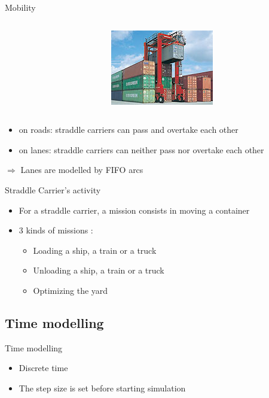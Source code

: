 \documentclass{beamer}
\begin{document}
\begin{frame}{Mobility}
\begin{center}
\begin{columns}
\begin{column}[c]{4.0cm}
    \end{column}
    \begin{column}[r]{3.0cm}	
      \includegraphics[height=.25\textheight]{fig/tn-straddle-carriers.jpg}
   \end{column}
\end{columns}
  \end{center}
\begin{itemize}
   \pause \item on roads: straddle carriers can pass and overtake each other
   \pause \item on lanes: straddle carriers can neither pass nor overtake each other
 \end{itemize}
\begin{center}
\pause $\Rightarrow$ Lanes are modelled by FIFO arcs
 \end{center}
 \end{frame}
\begin{frame}{Straddle Carrier's activity}
  \begin{itemize}   
   \item For a straddle carrier, a mission consists in moving a container
   \pause
    \item 3 kinds of missions : 
    \begin{itemize}
      \item Loading a ship, a train or a truck
      \pause
      \item Unloading a ship, a train or a truck
      \pause
      \item Optimizing the yard
    \end{itemize}
\end{itemize}
\end{frame}

  \subsection*{Time modelling}
\begin{frame}{Time modelling}  
  \begin{itemize}
   \item Discrete time
   \item The step size is set before starting simulation
  \end{itemize}
\end{frame}
\end{document}
